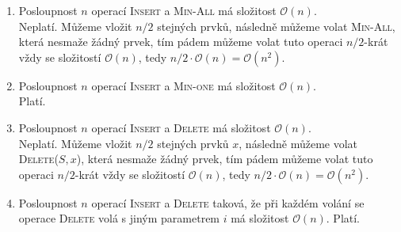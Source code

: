 \documentclass[12pt]{iv003}
\begin{document}
\begin{enumerate}
	\item Posloupnost $n$ operací \textsc{Insert} a \textsc{Min-All} má složitost $\mathcal{O}(n)$.\\
	Neplatí. Můžeme vložit $n/2$ stejných prvků, následně můžeme volat \textsc{Min-All}, která nesmaže žádný prvek, tím pádem můžeme volat tuto operaci $n/2$-krát vždy se složitostí $\mathcal{O}(n)$, tedy $n/2 \cdot \mathcal{O}(n) = \mathcal{O}(n^{2})$. 
	\item Posloupnost $n$ operací \textsc{Insert} a \textsc{Min-one} má složitost $\mathcal{O}(n)$.\\
	Platí.
	\item Posloupnost $n$ operací \textsc{Insert} a \textsc{Delete} má složitost $\mathcal{O}(n)$.\\
	Neplatí. Můžeme vložit $n/2$ stejných prvků $x$, následně můžeme volat \textsc{Delete}($S,x$), která nesmaže žádný prvek, tím pádem můžeme volat tuto operaci $n/2$-krát vždy se složitostí $\mathcal{O}(n)$, tedy $n/2 \cdot \mathcal{O}(n) = \mathcal{O}(n^{2})$. 
	\item Posloupnost $n$ operací \textsc{Insert} a \textsc{Delete} taková, že při každém volání se operace \textsc{Delete} volá s jiným parametrem $i$ má složitost $\mathcal{O}(n)$.
	Platí. 
\end{enumerate}
\end{document}

